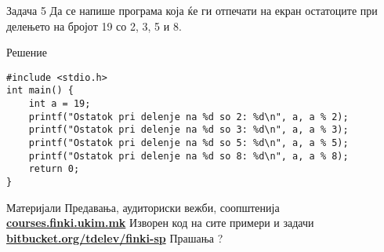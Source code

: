 \begin{frame}[fragile]{Задача 5}
Да се напише програма која ќе ги отпечати на екран остатоците при делењето на бројот 19 со 2, 3, 5 и 8.
    \begin{exampleblock}{Решение}
\begin{lstlisting}
#include <stdio.h>
int main() {
    int a = 19;
    printf("Ostatok pri delenje na %d so 2: %d\n", a, a % 2);
    printf("Ostatok pri delenje na %d so 3: %d\n", a, a % 3);
    printf("Ostatok pri delenje na %d so 5: %d\n", a, a % 5);
    printf("Ostatok pri delenje na %d so 8: %d\n", a, a % 8);
    return 0;
}
\end{lstlisting}
    \end{exampleblock}
\end{frame}

\begin{frame}{Материјали}{}
    Предавања, аудиториски вежби, соопштенија\\
    \href{http://courses.finki.ukim.mk/}{\textbf{courses.finki.ukim.mk}}
    \vfill
    Изворен код на сите примери и задачи\\
    \href{http://bitbucket.org/tdelev/finki-krs/}{\textbf{bitbucket.org/tdelev/finki-sp}}
    \vfill
    {\Huge Прашања ?}
\end{frame}
